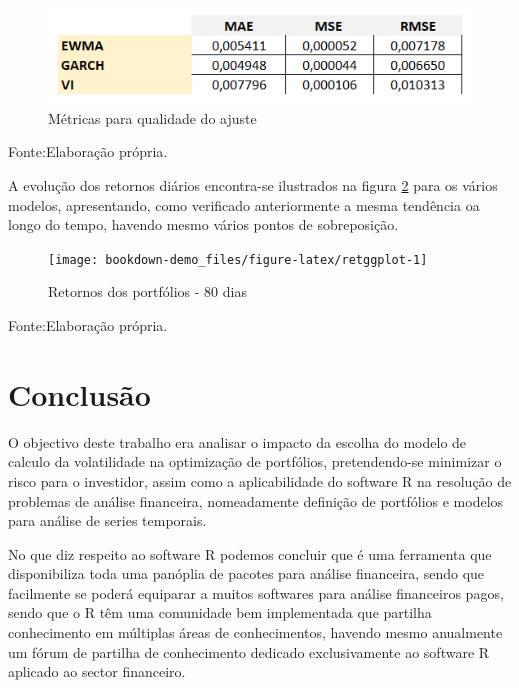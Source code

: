 \documentclass[
  12pt,
  a4paper,
  openany]{book}
\begin{document}
\begin{figure}

{\centering \includegraphics[width=0.8\linewidth]{image/mae} 

}

\caption{Métricas para qualidade do ajuste}\label{fig:mae}
\end{figure}
\FloatBarrier
\centering

Fonte:Elaboração própria.

\justifying
\bigskip

A evolução dos retornos diários encontra-se ilustrados na figura \ref{fig:retggplot} para os vários modelos, apresentando, como verificado anteriormente a mesma tendência oa longo do tempo, havendo mesmo vários pontos de sobreposição.

\begin{figure}

{\centering \texttt{[image: bookdown-demo\_files/figure-latex/retggplot-1]} 

}

\caption{Retornos dos portfólios - 80 dias}\label{fig:retggplot}
\end{figure}
\FloatBarrier
\centering

Fonte:Elaboração própria.

\justifying
\bigskip

\hypertarget{conclusuxe3o}{%
\chapter*{Conclusão}\label{conclusuxe3o}}

O objectivo deste trabalho era analisar o impacto da escolha do modelo de calculo da volatilidade na optimização de portfólios, pretendendo-se minimizar o risco para o investidor, assim como a aplicabilidade do software R na resolução de problemas de análise financeira, nomeadamente definição de portfólios e modelos para análise de series temporais.

No que diz respeito ao software R podemos concluir que é uma ferramenta que disponibiliza toda uma panóplia de pacotes para análise financeira, sendo que facilmente se poderá equiparar a muitos softwares para análise financeiros pagos, sendo que o R têm uma comunidade bem implementada que partilha conhecimento em múltiplas áreas de conhecimentos, havendo mesmo anualmente um fórum de partilha de conhecimento dedicado exclusivamente ao software R aplicado ao sector financeiro.
\end{document}
